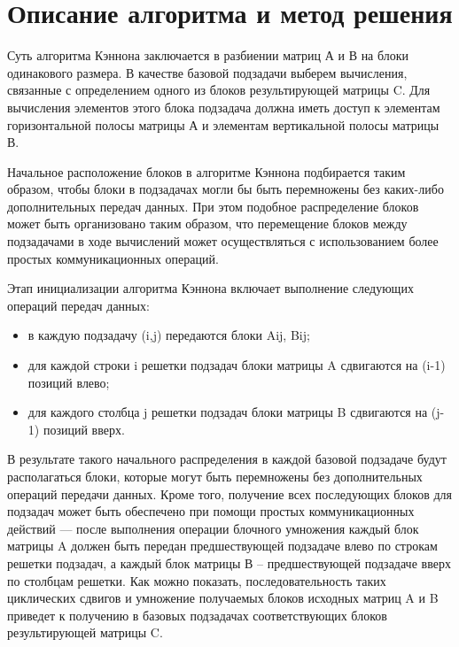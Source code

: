 \documentclass{report}
\begin{document}
\section*{Описание алгоритма и метод решения}
Суть алгоритма Кэннона заключается в разбиении матриц А и В на блоки одинакового размера. В качестве базовой подзадачи выберем вычисления, связанные с определением одного из блоков результирующей матрицы C. Для вычисления элементов этого блока подзадача должна иметь доступ к элементам горизонтальной полосы матрицы А и элементам вертикальной полосы матрицы В.
\par Начальное расположение блоков в алгоритме Кэннона подбирается таким образом, чтобы блоки в подзадачах могли бы быть перемножены без каких-либо дополнительных передач данных. При этом подобное распределение блоков может быть организовано таким образом, что перемещение блоков между подзадачами в ходе вычислений может осуществляться с использованием более простых коммуникационных операций.
\par Этап инициализации алгоритма Кэннона  включает выполнение следующих
операций передач данных:
\begin{itemize}
\item в каждую подзадачу (i,j) передаются блоки Aij, Bij;
\item для каждой строки i решетки подзадач блоки матрицы A сдвигаются на (i-1) позиций влево;
\item для каждого столбца j решетки подзадач блоки матрицы B сдвигаются на (j-1) позиций
вверх.
\end{itemize}
\par В результате такого начального распределения в каждой базовой подзадаче будут
располагаться блоки, которые могут быть перемножены без дополнительных операций передачи
данных. Кроме того, получение всех последующих блоков для подзадач может быть обеспечено
при помощи простых коммуникационных действий — после выполнения операции блочного
умножения каждый блок матрицы A должен быть передан предшествующей подзадаче влево по
строкам решетки подзадач, а каждый блок матрицы В – предшествующей подзадаче вверх по
столбцам решетки. Как можно показать, последовательность таких циклических сдвигов и
умножение получаемых блоков исходных матриц A и B приведет к получению в базовых
подзадачах соответствующих блоков результирующей матрицы C.
\newpage

\end{document}
